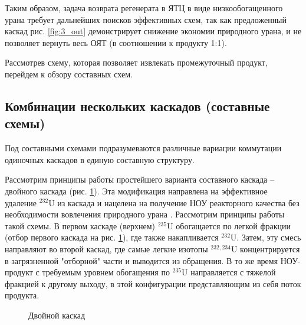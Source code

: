 Таким образом, задача возврата регенерата в ЯТЦ в виде низкообогащенного урана требует дальнейших поисков эффективных схем, так как предложенный каскад рис. \ref{fig:3_out} демонстрирует снижение экономии природного урана, и не позволяет вернуть весь ОЯТ (в соотношении к продукту 1:1).

Рассмотрев схему, которая позволяет извлекать промежуточный продукт, перейдем к обзору  составных схем.


\subsection{Комбинации нескольких каскадов (составные схемы)}\label{sec:ch1/sec2.3}
Под составными схемами подразумеваются различные вариации коммутации одиночных каскадов в единую составную структуру.

Рассмотрим принципы работы простейшего варианта составного каскада -- двойного каскада (рис. \ref{fig:double_ru}).
Эта модификация направлена на эффективное удаление $^{232}$U из каскада и нацелена на получение НОУ реакторного качества без необходимости вовлечения природного урана \cite{SosninYuChelcov, TehnicheskieResheniyaPo}.
Рассмотрим принципы работы такой схемы.
В первом каскаде (верхнем) $^{235}$U обогащается по легкой фракции (отбор первого каскада на рис. \ref{fig:double_ru}), где также накапливается $^{232}$U.
Затем, эту смесь направляют во второй каскад, где самые легкие изотопы $^{232,234}$U концентрируется в загрязненной "отборной" части и выводится из обращения.
В то же время НОУ-продукт с требуемым уровнем обогащения по $^{235}$U направляется с тяжелой фракцией к другому выходу, в этой конфигурации представляющим из себя поток продукта.
\begin{figure}[ht]
  \caption{Двойной каскад}\label{fig:double_ru}
\end{figure}

